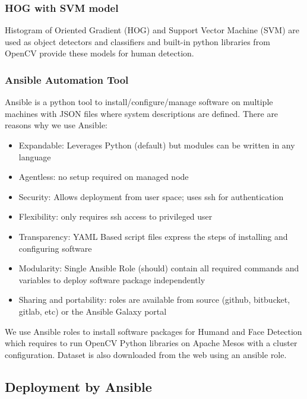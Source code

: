 \subsubsection{HOG with SVM model}\label{hog-with-svm-model}

Histogram of Oriented Gradient (HOG) and Support Vector Machine (SVM)
are used as object detectors and classifiers and built-in python
libraries from OpenCV provide these models for human detection.

\subsubsection{Ansible Automation Tool}\label{ansible-automation-tool}

Ansible is a python tool to install/configure/manage software on
multiple machines with JSON files where system descriptions are defined.
There are reasons why we use Ansible:

\begin{itemize}

\item
  Expandable: Leverages Python (default) but modules can be written in
  any language
\item
  Agentless: no setup required on managed node
\item
  Security: Allows deployment from user space; uses ssh for
  authentication
\item
  Flexibility: only requires ssh access to privileged user
\item
  Transparency: YAML Based script files express the steps of installing
  and configuring software
\item
  Modularity: Single Ansible Role (should) contain all required commands
  and variables to deploy software package independently
\item
  Sharing and portability: roles are available from source (github,
  bitbucket, gitlab, etc) or the Ansible Galaxy portal
\end{itemize}

We use Ansible roles to install software packages for Humand and Face
Detection which requires to run OpenCV Python libraries on Apache Mesos
with a cluster configuration. Dataset is also downloaded from the web
using an ansible role.

\subsection{Deployment by Ansible}\label{deployment-by-ansible}

